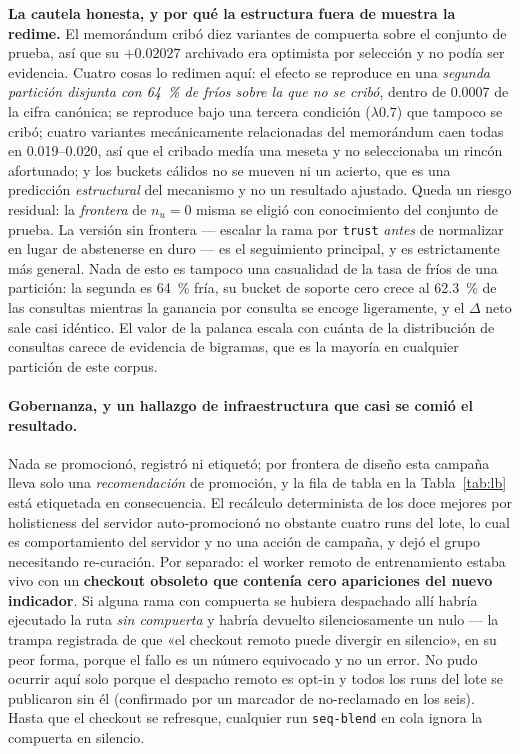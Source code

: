 \documentclass[11pt]{article}
\begin{document}
\textbf{La cautela honesta, y por qué la estructura fuera de muestra la redime.} El
memorándum cribó diez variantes de compuerta sobre el conjunto de prueba, así que
su $+\num{0.02027}$ archivado era optimista por selección y no podía ser evidencia.
Cuatro cosas lo redimen aquí: el efecto se reproduce en una \emph{segunda partición
disjunta con \SI{64}{\percent} de fríos sobre la que no se cribó}, dentro de
\num{0.0007} de la cifra canónica; se reproduce bajo una tercera condición
($\lambda\num{0.7}$) que tampoco se cribó; cuatro variantes mecánicamente
relacionadas del memorándum caen todas en \numrange{0.019}{0.020}, así que el
cribado medía una meseta y no seleccionaba un rincón afortunado; y los buckets
cálidos no se mueven ni un acierto, que es una predicción \emph{estructural} del
mecanismo y no un resultado ajustado. Queda un riesgo residual: la \emph{frontera}
de $n_u = 0$ misma se eligió con conocimiento del conjunto de prueba. La versión
sin frontera --- escalar la rama por \texttt{trust} \emph{antes} de normalizar en
lugar de abstenerse en duro --- es el seguimiento principal, y es estrictamente más
general. Nada de esto es tampoco una casualidad de la tasa de fríos de una
partición: la segunda es \SI{64}{\percent} fría, su bucket de soporte cero crece al
\SI{62.3}{\percent} de las consultas mientras la ganancia por consulta se encoge
ligeramente, y el $\Delta$ neto sale casi idéntico. El valor de la palanca escala
con cuánta de la distribución de consultas carece de evidencia de bigramas, que es
la mayoría en cualquier partición de este corpus.

\paragraph{Gobernanza, y un hallazgo de infraestructura que casi se comió el
resultado.} Nada se promocionó, registró ni etiquetó; por frontera de diseño esta
campaña lleva solo una \emph{recomendación} de promoción, y la fila de tabla en la
Tabla~\ref{tab:lb} está etiquetada en consecuencia. El recálculo determinista de
los doce mejores por holisticness del servidor auto-promocionó no obstante cuatro
runs del lote, lo cual es comportamiento del servidor y no una acción de campaña, y
dejó el grupo necesitando re-curación. Por separado: el worker remoto de
entrenamiento estaba vivo con un \textbf{checkout obsoleto que contenía cero
apariciones del nuevo indicador}. Si alguna rama con compuerta se hubiera
despachado allí habría ejecutado la ruta \emph{sin compuerta} y habría devuelto
silenciosamente un nulo --- la trampa registrada de que «el checkout remoto puede
divergir en silencio», en su peor forma, porque el fallo es un número equivocado y
no un error. No pudo ocurrir aquí solo porque el despacho remoto es opt-in y todos
los runs del lote se publicaron sin él (confirmado por un marcador de no-reclamado
en los seis). Hasta que el checkout se refresque, cualquier run \texttt{seq-blend}
en cola ignora la compuerta en silencio.
\end{document}
